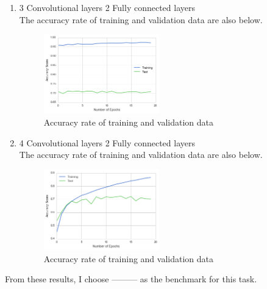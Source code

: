\begin{enumerate}
\begin{figure}[htbp]
\end{figure}


 \item 3 Convolutional layers 2 Fully connected layers \\
 The accuracy rate of training and validation data are also below.
 
 \begin{figure}[htbp]

	\begin{center}
	\includegraphics[width=5cm]{picture/3layer_cnn.png}
	\caption{Accuracy rate of training and validation data}
	\end{center}
	\label{fig:ten}

\end{figure}
 \item 4 Convolutional layers 2 Fully connected layers \\
 The accuracy rate of training and validation data are also below.
 
 \begin{figure}[htbp]

	\begin{center}
	\includegraphics[width=5cm]{picture/4layer_cnn.png}
	\caption{Accuracy rate of training and validation data}
	\end{center}
	\label{fig:eleven}

\end{figure}
\end{enumerate}


From these results, I choose --------- as the benchmark for this task.
